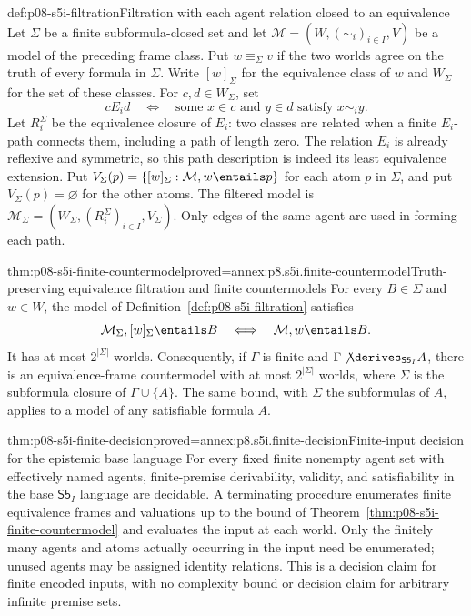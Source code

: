 \begin{hbdefinition}{def:p08-s5i-filtration}{Filtration with each agent relation closed to an equivalence}
Let \(\Sigma\) be a finite subformula-closed set and let
\(\mathcal M=(W,(\sim_i)_{i\in I},V)\) be a model of the preceding
frame class. Put \(w\equiv_\Sigma v\) if the two worlds agree on the
truth of every formula in \(\Sigma\). Write \([w]_\Sigma\) for the
equivalence class of \(w\) and \(W_\Sigma\) for the set of these classes.
For \(c,d\in W_\Sigma\), set
\[
 cE_i d\quad\Longleftrightarrow\quad
 \text{some }x\in c\text{ and }y\in d\text{ satisfy }x\sim_i y.
\]
Let \(R_i^\Sigma\) be the equivalence closure of \(E_i\): two classes
are related when a finite \(E_i\)-path connects them, including a path of
length zero. The relation \(E_i\) is already reflexive and symmetric, so
this path description is indeed its least equivalence extension. Put
\(V_\Sigma(p)=\{[w]_\Sigma:\mathcal M,w\entails p\}\) for each atom
\(p\) in \(\Sigma\), and put \(V_\Sigma(p)=\varnothing\) for the
other atoms. The filtered model is
\(\mathcal M_\Sigma=(W_\Sigma,(R_i^\Sigma)_{i\in I},V_\Sigma)\).
Only edges of the same agent are used in forming each path.
\end{hbdefinition}

\begin{hbtheorem}{thm:p08-s5i-finite-countermodel}{proved=annex:p8.s5i.finite-countermodel}{Truth-preserving equivalence filtration and finite countermodels}
For every \(B\in\Sigma\) and \(w\in W\), the model of
Definition~\ref{def:p08-s5i-filtration} satisfies
\[
 \mathcal M_\Sigma,[w]_\Sigma\entails B
 \quad\Longleftrightarrow\quad \mathcal M,w\entails B.
\]
It has at most \(2^{\lvert\Sigma\rvert}\) worlds. Consequently, if
\(\Gamma\) is finite and
\(\Gamma\not\derives_{\mathsf{S5}_I}A\), there is an equivalence-frame
countermodel with at most \(2^{\lvert\Sigma\rvert}\) worlds, where
\(\Sigma\) is the subformula closure of \(\Gamma\cup\{A\}\).
The same bound, with \(\Sigma\) the subformulas of \(A\), applies to
a model of any satisfiable formula \(A\).
\end{hbtheorem}

\begin{hbtheorem}{thm:p08-s5i-finite-decision}{proved=annex:p8.s5i.finite-decision}{Finite-input decision for the epistemic base language}
For every fixed finite nonempty agent set with effectively named agents,
finite-premise derivability, validity, and satisfiability in the base
\(\mathsf{S5}_I\) language are decidable. A terminating procedure
enumerates finite equivalence frames and valuations up to the bound of
Theorem~\ref{thm:p08-s5i-finite-countermodel} and evaluates the input at
each world. Only the finitely many agents and atoms actually occurring in
the input need be enumerated; unused agents may be assigned identity
relations. This is a decision claim for finite encoded inputs, with no
complexity bound or decision claim for arbitrary infinite premise sets.
\end{hbtheorem}

